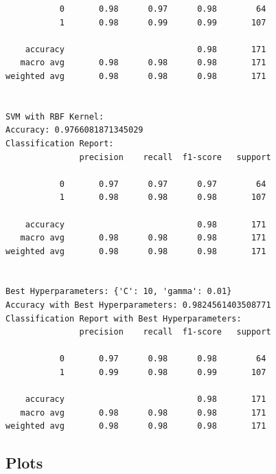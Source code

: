 \documentclass[a4paper,12pt]{article}
\begin{document}
\begin{verbatim}
           0       0.98      0.97      0.98        64
           1       0.98      0.99      0.99       107

    accuracy                           0.98       171
   macro avg       0.98      0.98      0.98       171
weighted avg       0.98      0.98      0.98       171


SVM with RBF Kernel:
Accuracy: 0.9766081871345029
Classification Report:
               precision    recall  f1-score   support

           0       0.97      0.97      0.97        64
           1       0.98      0.98      0.98       107

    accuracy                           0.98       171
   macro avg       0.98      0.98      0.98       171
weighted avg       0.98      0.98      0.98       171


Best Hyperparameters: {'C': 10, 'gamma': 0.01}
Accuracy with Best Hyperparameters: 0.9824561403508771
Classification Report with Best Hyperparameters:
               precision    recall  f1-score   support

           0       0.97      0.98      0.98        64
           1       0.99      0.98      0.99       107

    accuracy                           0.98       171
   macro avg       0.98      0.98      0.98       171
weighted avg       0.98      0.98      0.98       171
\end{verbatim}

\subsection{Plots}
\end{document}
